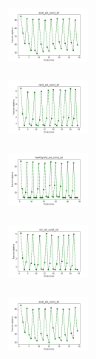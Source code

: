 \begin{figure}[H]
    \begin{subfigure}
        \centering
        \includegraphics[width=0.234\textwidth]{img/ils-es/ecoli_set_const_20_589741062_cost.png}
    \end{subfigure}
    \hfill
    \begin{subfigure}
        \centering
        \includegraphics[width=0.234\textwidth]{img/ils-es/rand_set_const_20_589741062_cost.png}
    \end{subfigure}
    \hfill
    \begin{subfigure}
        \centering
        \includegraphics[width=0.234\textwidth]{img/ils-es/newthyroid_set_const_20_589741062_cost.png}
    \end{subfigure}
    \hfill
    \begin{subfigure}
        \centering
        \includegraphics[width=0.234\textwidth]{img/ils-es/iris_set_const_20_277451237_cost.png}
    \end{subfigure}
    \hfill
    \begin{subfigure}
        \centering
        \includegraphics[width=0.234\textwidth]{img/ils-es/ecoli_set_const_20_277451237_cost.png}
    \end{subfigure}
    \hfill
    \begin{subfigure}

\end{subfigure}
\end{figure}
